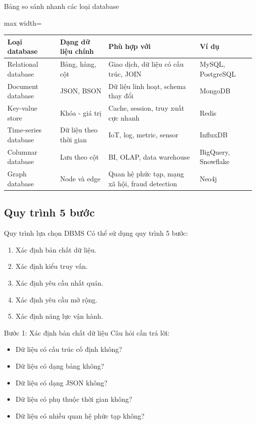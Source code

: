 \documentclass[aspectratio=169,11pt]{beamer}
\newcommand{\smallitem}{\setlength{\itemsep}{2pt}\setlength{\parskip}{0pt}}
\begin{document}
\begin{frame}{Bảng so sánh nhanh các loại database}
\scriptsize
\begin{adjustbox}{max width=\textwidth}
\begin{tabularx}{1.08\textwidth}{>{\raggedright\arraybackslash}p{}>{\raggedright\arraybackslash}p{}>{\raggedright\arraybackslash}p{}>{\raggedright\arraybackslash}X}
\toprule
\textbf{Loại database} & \textbf{Dạng dữ liệu chính} & \textbf{Phù hợp với} & \textbf{Ví dụ} \\
\midrule
Relational database & Bảng, hàng, cột & Giao dịch, dữ liệu có cấu trúc, JOIN & MySQL, PostgreSQL \\
Document database & JSON, BSON & Dữ liệu linh hoạt, schema thay đổi & MongoDB \\
Key-value store & Khóa - giá trị & Cache, session, truy xuất cực nhanh & Redis \\
Time-series database & Dữ liệu theo thời gian & IoT, log, metric, sensor & InfluxDB \\
Columnar database & Lưu theo cột & BI, OLAP, data warehouse & BigQuery, Snowflake \\
Graph database & Node và edge & Quan hệ phức tạp, mạng xã hội, fraud detection & Neo4j \\
\bottomrule
\end{tabularx}
\end{adjustbox}
\end{frame}

\subsection{Quy trình 5 bước}
\begin{frame}{Quy trình lựa chọn DBMS}
Có thể sử dụng quy trình 5 bước:
\begin{enumerate}
  \smallitem
  \item Xác định bản chất dữ liệu.
  \item Xác định kiểu truy vấn.
  \item Xác định yêu cầu nhất quán.
  \item Xác định yêu cầu mở rộng.
  \item Xác định năng lực vận hành.
\end{enumerate}
\end{frame}

\begin{frame}{Bước 1: Xác định bản chất dữ liệu}
Câu hỏi cần trả lời:
\begin{itemize}
  \smallitem
  \item Dữ liệu có cấu trúc cố định không?
  \item Dữ liệu có dạng bảng không?
  \item Dữ liệu có dạng JSON không?
  \item Dữ liệu có phụ thuộc thời gian không?
  \item Dữ liệu có nhiều quan hệ phức tạp không?
\end{itemize}
\end{frame}
\end{document}
